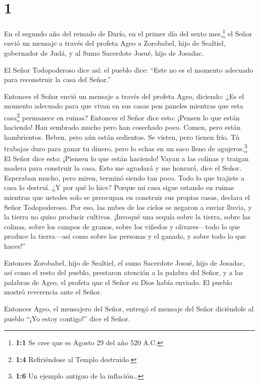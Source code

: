 \hypertarget{section}{%
\section{1}\label{section}}

 En el segundo año del reinado de Darío, en el primer día
del sexto mes,\footnote{\textbf{1:1} Se cree que es Agosto 29 del año
  520 A.C.} el Señor envió un mensaje a través del profeta Ageo a
Zorobabel, hijo de Sealtiel, gobernador de Judá, y al Sumo Sacerdote
Josué, hijo de Josadac.

 El Señor Todopoderoso dice así: el pueblo dice: ``Este no
es el momento adecuado para reconstruir la casa del Señor.''

 Entonces el Señor envió un mensaje a través del profeta
Ageo, diciendo:  ¿Es el momento adecuado para que vivan en
sus casas pon paneles mientras que esta casa\footnote{\textbf{1:4}
  Refiriéndose al Templo destruido.} permanece en ruinas? 
Entonces el Señor dice esto: ¡Pensen lo que están haciendo! 
Han sembrado mucho pero han cosechado poco. Comen, pero están
hambrientos. Beben, pero aún están sedientos. Se visten, pero tienen
frío. Tú trabajas duro para ganar tu dinero, pero lo echas en un saco
lleno de agujeros.\footnote{\textbf{1:6} Un ejemplo antiguo de la
  inflación\ldots{}}  El Señor dice esto: ¡Piensen lo que
están haciendo!  Vayan a las colinas y traigan madera para
construir la casa. Esto me agradará y me honrará, dice el Señor.
 Esperaban mucho, pero miren, terminó siendo tan poco. Todo
lo que trajiste a casa lo destruí. ¿Y por qué lo hice? Porque mi casa
sigue estando en ruinas mientras que ustedes solo se preocupan en
construir sus propias casas, declara el Señor Todopoderoso.
 Por eso, las nubes de los cielos se negaron a enviar
lluvia, y la tierra no quiso producir cultivos.  ¡Invoqué
una sequía sobre la tierra, sobre las colinas, sobre los campos de
granos, sobre los viñedos y olivares---todo lo que produce la
tierra---así como sobre las personas y el ganado, y sobre todo lo que
haces!''

 Entonces Zorobabel, hijo de Sealtiel, el sumo Sacerdote
Josué, hijo de Josadac, así como el resto del pueblo, prestaron atención
a la palabra del Señor, y a las palabras de Ageo, el profeta que el
Señor su Dios había enviado. El pueblo mostró reverencia ante el Señor.

 Entonces Ageo, el mensajero del Señor, entregó el mensaje
del Señor diciéndole al pueblo ``¡Yo estoy contigo!'' dice el Señor.

